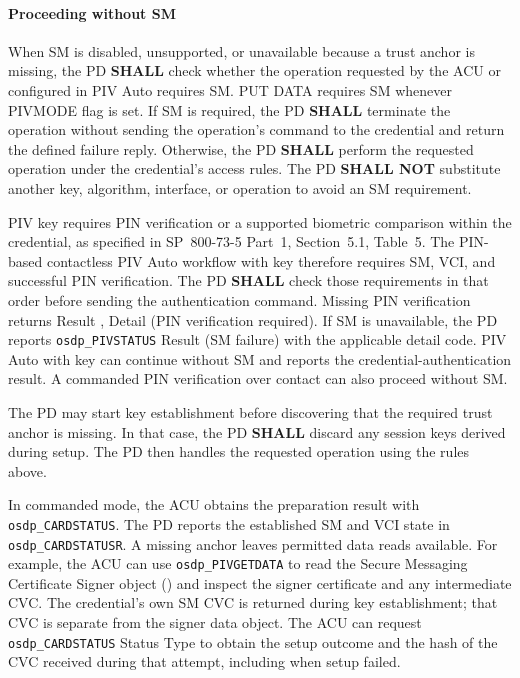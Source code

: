 \paragraph{Proceeding without SM}
When SM is disabled, unsupported, or unavailable because a trust anchor is
missing, the PD \textbf{SHALL} check whether the operation requested by the
ACU or configured in PIV Auto requires SM. PUT DATA requires SM whenever
PIVMODE flag  is set. If SM is required, the PD
\textbf{SHALL} terminate the operation without sending the operation's command
to the credential and return the defined failure reply. Otherwise,
the PD \textbf{SHALL} perform the requested operation under the credential's access
rules. The PD \textbf{SHALL NOT} substitute another key, algorithm, interface,
or operation to avoid an SM requirement.

PIV key  requires PIN verification or a supported biometric
comparison within the credential, as specified in SP~800-73-5 Part~1,
Section~5.1, Table~5. The PIN-based contactless PIV Auto workflow with key 
therefore requires SM, VCI, and successful PIN verification. The PD
\textbf{SHALL} check those requirements in that order before sending the
authentication command. Missing PIN verification returns Result ,
Detail  (PIN verification required).
If SM is unavailable, the PD reports \texttt{osdp\_PIVSTATUS} Result
 (SM failure) with the applicable detail code. PIV Auto with key
 can continue without SM and reports the credential-authentication result.
A commanded PIN verification over contact can also proceed without SM.

The PD may start key establishment before discovering that the required
trust anchor is missing. In that case, the PD \textbf{SHALL} discard any
session keys derived during setup. The PD then handles the requested operation
using the rules above.

In commanded mode, the ACU obtains the preparation result with
\texttt{osdp\_CARDSTATUS}. The PD reports the established SM and VCI state in
\texttt{osdp\_CARDSTATUSR}. A missing anchor leaves permitted data reads
available. For example, the ACU can use \texttt{osdp\_PIVGETDATA} to read the
Secure Messaging Certificate Signer object () and inspect the
signer certificate and any intermediate CVC. The credential's own SM CVC is returned
during key establishment; that CVC is separate from the signer data object.
The ACU can request \texttt{osdp\_CARDSTATUS} Status Type  to obtain
the setup outcome and the hash of the CVC received during that attempt, including when
setup failed.


